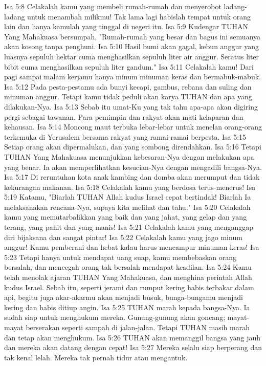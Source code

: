 Isa 5:8  Celakalah kamu yang membeli rumah-rumah dan menyerobot ladang-ladang untuk menambah milikmu! Tak lama lagi habislah tempat untuk orang lain dan hanya kamulah yang tinggal di negeri itu.
Isa 5:9  Kudengar TUHAN Yang Mahakuasa bersumpah, "Rumah-rumah yang besar dan bagus ini semuanya akan kosong tanpa penghuni.
Isa 5:10  Hasil bumi akan gagal, kebun anggur yang luasnya sepuluh hektar cuma menghasilkan sepuluh liter air anggur. Seratus liter bibit cuma menghasilkan sepuluh liter gandum."
Isa 5:11  Celakalah kamu! Dari pagi sampai malam kerjamu hanya minum minuman keras dan bermabuk-mabuk.
Isa 5:12  Pada pesta-pestamu ada bunyi kecapi, gambus, rebana dan suling dan minuman anggur. Tetapi kamu tidak peduli akan karya TUHAN dan apa yang dilakukan-Nya.
Isa 5:13  Sebab itu umat-Ku yang tak tahu apa-apa akan digiring pergi sebagai tawanan. Para pemimpin dan rakyat akan mati kelaparan dan kehausan.
Isa 5:14  Moncong maut terbuka lebar-lebar untuk menelan orang-orang terkemuka di Yerusalem bersama rakyat yang ramai-ramai berpesta.
Isa 5:15  Setiap orang akan dipermalukan, dan yang sombong direndahkan.
Isa 5:16  Tetapi TUHAN Yang Mahakuasa menunjukkan kebesaran-Nya dengan melakukan apa yang benar. Ia akan memperlihatkan kesucian-Nya dengan mengadili bangsa-Nya.
Isa 5:17  Di reruntuhan kota anak kambing dan domba akan merumput dan tidak kekurangan makanan.
Isa 5:18  Celakalah kamu yang berdosa terus-menerus!
Isa 5:19  Katamu, "Biarlah TUHAN Allah kudus Israel cepat bertindak! Biarlah Ia melaksanakan rencana-Nya, supaya kita melihat dan tahu."
Isa 5:20  Celakalah kamu yang memutarbalikkan yang baik dan yang jahat, yang gelap dan yang terang, yang pahit dan yang manis!
Isa 5:21  Celakalah kamu yang menganggap diri bijaksana dan sangat pintar!
Isa 5:22  Celakalah kamu yang jago minum anggur! Kamu pemberani dan hebat kalau harus mencampur minuman keras!
Isa 5:23  Tetapi hanya untuk mendapat uang suap, kamu membebaskan orang bersalah, dan mencegah orang tak bersalah mendapat keadilan.
Isa 5:24  Kamu telah menolak ajaran TUHAN Yang Mahakuasa, dan menghina perintah Allah kudus Israel. Sebab itu, seperti jerami dan rumput kering habis terbakar dalam api, begitu juga akar-akarmu akan menjadi busuk, bunga-bungamu menjadi kering dan habis ditiup angin.
Isa 5:25  TUHAN marah kepada bangsa-Nya. Ia sudah siap untuk menghukum mereka. Gunung-gunung akan goncang; mayat-mayat berserakan seperti sampah di jalan-jalan. Tetapi TUHAN masih marah dan tetap akan menghukum.
Isa 5:26  TUHAN akan memanggil bangsa yang jauh dan mereka akan datang dengan cepat!
Isa 5:27  Mereka selalu siap berperang dan tak kenal lelah. Mereka tak pernah tidur atau mengantuk.
